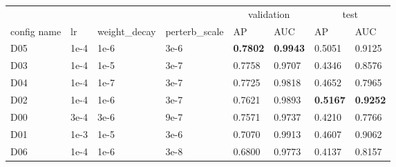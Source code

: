 \begin{table*}[t]
\centering
\begin{tabular}{llllllll}
\toprule
            \multicolumn{4}{l}{} & \multicolumn{2}{c}{validation} & \multicolumn{2}{c}{test} \\
config name &   lr & weight\_decay & perterb\_scale & AP & AUC & AP & AUC \\
\midrule
        \textcolor[HTML]{623682}{D05} & 1e-4 &   1e-6 &  3e-6 & \textbf{0.7802} & \textbf{0.9943} &          0.5051 &          0.9125 \\
        \textcolor[HTML]{df8020}{D03} & 1e-4 &   1e-5 &  3e-7 &          0.7758 &          0.9707 &          0.4346 &          0.8576 \\
        \textcolor[HTML]{87b787}{D04} & 1e-4 &   1e-7 &  3e-7 &          0.7725 &          0.9818 &          0.4652 &          0.7965 \\
        \textcolor[HTML]{207fdf}{D02} & 1e-4 &   1e-6 &  3e-7 &          0.7621 &          0.9893 & \textbf{0.5167} & \textbf{0.9252} \\
        \textcolor[HTML]{20df20}{D00} & 3e-4 &   3e-6 &  9e-7 &          0.7571 &          0.9737 &          0.4210 &          0.7766 \\
        \textcolor[HTML]{df20df}{D01} & 1e-3 &   1e-5 &  3e-6 &          0.7070 &          0.9913 &          0.4607 &          0.9062 \\
        \textcolor[HTML]{b00403}{D06} & 1e-4 &   1e-6 &  3e-8 &          0.6800 &          0.9773 &          0.4137 &          0.8157 \\
        

\end{tabular}
\end{table*}
